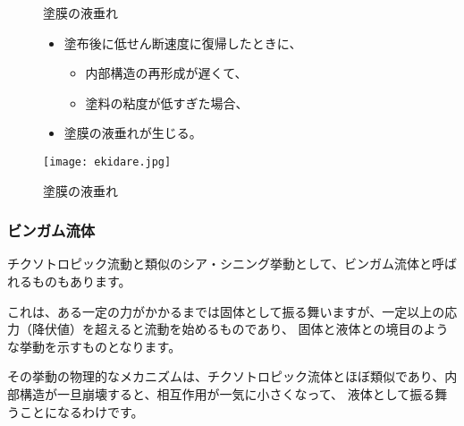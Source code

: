 \documentclass[uplatex,dvipdfmx,a4paper,11pt]{jsreport}
\begin{document}
\begin{figure}[htb]
	\begin{center}
		\begin{minipage}{0.45\textwidth}
			\begin{itembox}[l]{塗膜の液垂れ}
				\begin{itemize}
					\item 塗布後に低せん断速度に復帰したときに、
					\begin{itemize}
						\item 内部構造の再形成が遅くて、
						\item 塗料の粘度が低すぎた場合、
					\end{itemize}
					\item 塗膜の液垂れが生じる。
				\end{itemize}
			\end{itembox}
		\end{minipage}
		\begin{minipage}{0.45\textwidth}
			\begin{center}
			\texttt{[image: ekidare.jpg]}
			\end{center}
		\end{minipage}
		\caption{塗膜の液垂れ}
		\label{fig:ekidare}
	\end{center}
\end{figure}

\subsubsection{ビンガム流体}

チクソトロピック流動と類似のシア・シニング挙動として、ビンガム流体と呼ばれるものもあります。

これは、ある一定の力がかかるまでは固体として振る舞いますが、一定以上の応力（降伏値）を超えると流動を始めるものであり、
固体と液体との境目のような挙動を示すものとなります。

その挙動の物理的なメカニズムは、チクソトロピック流体とほぼ類似であり、内部構造が一旦崩壊すると、相互作用が一気に小さくなって、
液体として振る舞うことになるわけです。
\end{document}
